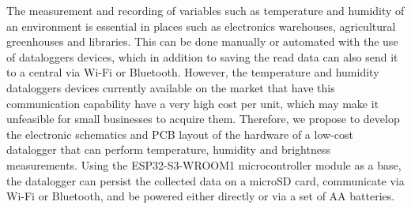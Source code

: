 
The measurement and recording of variables such as temperature and humidity of an environment is essential in places such as electronics warehouses, agricultural greenhouses and libraries. This can be done manually or automated with the use of dataloggers devices, which in addition to saving the read data can also send it to a central via Wi-Fi or Bluetooth. However, the temperature and humidity dataloggers devices currently available on the market that have this communication capability have a very high cost per unit, which may make it unfeasible for small businesses to acquire them. Therefore, we propose to develop the electronic schematics and PCB layout of the hardware of a low-cost datalogger that can perform temperature, humidity and brightness measurements. Using the ESP32-S3-WROOM1 microcontroller module as a base, the datalogger can persist the collected data on a microSD card, communicate via Wi-Fi or Bluetooth, and be powered either directly or via a set of AA batteries. 

